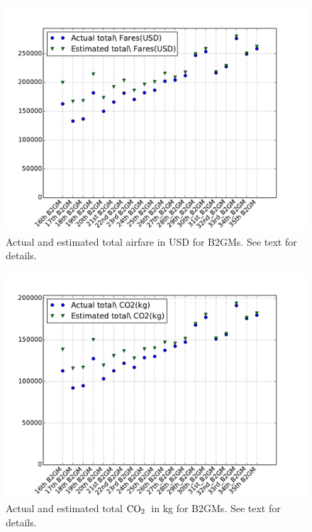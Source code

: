 \documentclass[12pt]{article}
\newcommand{\COtwo}{${\rm CO}_2$}
\begin{document}
\begin{figure}[htbp]
\begin{center}
\includegraphics[width=\textwidth]{../FIGURES/B2GM_Fares.pdf}
\caption{Actual and estimated total airfare in USD for B2GMs. See text for details.}
\label{fig:B2GM_fares}
\end{center}
\end{figure}

 \begin{figure}[htbp]
\begin{center}
\includegraphics[width=\textwidth]{../FIGURES/B2GM_CO2.pdf}
\caption{Actual and estimated total \COtwo\ in kg for B2GMs. See text for details.}
\label{fig:B2GM_COtwo}
\end{center}
\end{figure}
\end{document}
